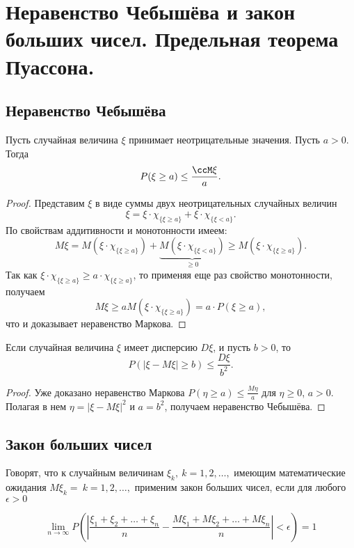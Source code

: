 \chapter{Неравенство Чебышёва и закон больших чисел. Предельная теорема Пуассона.}
\section{Неравенство Чебышёва}
\begin{thm}
Пусть случайная величина $\xi$ принимает неотрицательные значения. Пусть $a>0$. Тогда 
$$
P(\xi \ge a)\le\frac{\ccM\xi}{a}.
$$
\end{thm}
\begin{proof}
Представим $\xi$ в виде суммы двух неотрицательных случайных величин
$$
\xi = \xi\cdot\chi_{\{\xi\ge a\}}+\xi\cdot\chi_{\{\xi< a\}}.
$$
По свойствам аддитивности и монотонности имеем:
$$
M \xi=M (\xi\cdot\chi_{\{\xi\ge a\}})+\underbrace{M (\xi\cdot\chi_{\{\xi< a\}})}_{\ge 0} \ge M (\xi\cdot\chi_{\{\xi\ge a\}}).
$$
Так как $\xi\cdot\chi_{\{\xi\ge a\}}\ge a\cdot\chi_{\{\xi\ge a\}}$, то применяя еще раз свойство монотонности, получаем
$$
M \xi\ge aM (\xi\cdot\chi_{\{\xi\ge a\}})=a\cdot P(\xi\ge a),
$$
что и доказывает неравенство Маркова.
\end{proof}

\begin{thm}
Если случайная величина $\xi$ имеет дисперсию $D \xi$, и пусть $b>0$, то
$$
P(|\xi-M \xi|\ge b ) \le\frac{D \xi}{b^2}.
$$
\end{thm} 
\begin{proof}
Уже доказано неравенство Маркова $P(\eta \ge a) \le \frac{M\eta}{a}$  для $\eta \ge 0$, $a>0$. Полагая в нем $\eta = |\xi-M \xi|^2$ и $a=b^2$, получаем неравенство Чебышёва.
\end{proof}

\section{Закон больших чисел}

Говорят, что к случайным величинам $\xi_k, \: k = 1, 2, \ldots,$ имеющим математические ожидания $M\xi_k = \: k = 1, 2,\ldots,$ применим закон больших чисел, если для любого $\epsilon > 0$

\begin{equation} \label{ch32.2eq4}
\lim_{n \to \infty} P \left( \left| \frac{\xi_1 + \xi_2 + \ldots + \xi_n}{n} - \frac{M \xi_1 + M \xi_2 + \ldots + M \xi_n}{n} \right| < \epsilon \right) = 1
\end{equation}

